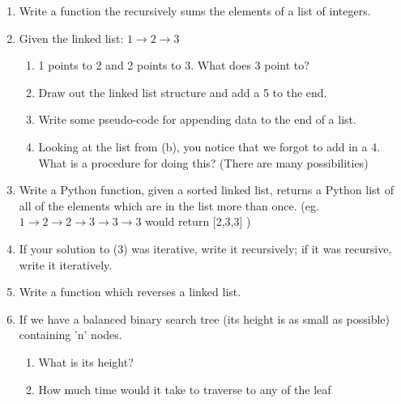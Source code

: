 \documentclass[11pt]{article}
\begin{document}

\begin{enumerate}
    \item Write a function the recursively sums the elements of a list of integers.
        \vspace{2.5in}
    \item Given the linked list: $1 \rightarrow 2 \rightarrow 3$
        \begin{enumerate}
            \item 1 points to 2 and 2 points to 3. What does 3 point to?
                \vspace{0.5in}
            \item Draw out the linked list structure and add a 5 to the end.
                \vspace{1.25in}
            \item Write some pseudo-code for appending data to the end of a list.
                \vspace{3.5in}
            \pagebreak
            \item Looking at the list from (b), you notice that we forgot to
                  add in a 4. What is a procedure for doing this? (There are
                  many possibilities)
                \vspace{2.5in}
        \end{enumerate}
    \item Write a Python function, given a sorted linked list, returns a Python
    list of all of the elements which are in the list more than once. (eg.
    $1\rightarrow2\rightarrow2\rightarrow3\rightarrow3\rightarrow3$ would return [2,3,3] )
        \vspace{3in}
    \item If your solution to (3) was iterative, write it recursively; if it
    was recursive, write it iteratively.
        \pagebreak
    \item Write a function which reverses a linked list.
        \vspace{4in}
    \item If we have a balanced binary search tree (its height is as small as
    possible) containing 'n' nodes.
        \begin{enumerate}
            \item What is its height?
                \vspace{.25in}
            \item How much time would it take to traverse to any of the leaf

\end{enumerate}
\end{enumerate}
\end{document}
